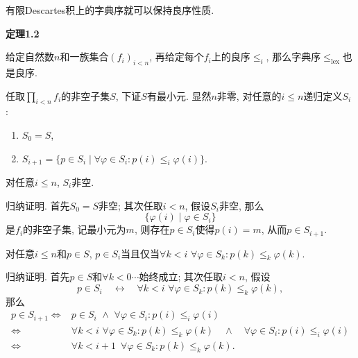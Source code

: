 \newpage

有限Descartes积上的字典序就可以保持良序性质.

\vspace{10pt}

\hypertarget{sec:定理1.2}{}
\noindent\textbf{定理1.2}

给定自然数$n$和一族集合$(f_i)_{i<n}$,
再给定每个$f_i$上的良序$\leqslant_i$, 那么字典序$\leqslant_{\mathrm{lex}}$也是良序.


任取$\displaystyle\prod_{i<n}f_i$的非空子集$S$, 下证$S$有最小元.
显然$n$非零, 对任意的$i\leqslant n$递归定义$S_i$ :
\vspace{6pt}
\begin{enumerate}
    \item $S_0=S$,
    \item $S_{i+1}=\{p\in S_i\mid\forall\varphi\in S_i:p(i)\leqslant_i\varphi(i)\}$.
\end{enumerate}

\vspace{5pt}\hspace{-1em}{\kaishu 命题1.} 对任意$i\leqslant n$, $S_i$非空.

\vspace{3pt}
归纳证明. 首先$S_0=S$非空; 其次任取$i<n$, 假设$S_i$非空, 那么
\[
    \{\varphi(i)\mid\varphi\in S_i\}
\]
是$f_i$的非空子集, 记最小元为$m$, 则存在$p\in S_i$使得$p(i)=m$, 从而$p\in S_{i+1}$.

\vspace{5pt}\hspace{-1em}{\kaishu 命题2.}
对任意$i\leqslant n$和$p\in S$,
$p\in S_i$当且仅当$\forall k<i\,\,\forall\varphi\in S_k:p(k)\leqslant_k\varphi(k)$.

\vspace{3pt}
归纳证明. 首先$p\in S$和$\forall k<0\cdots$始终成立; 其次任取$i<n$, 假设
\[
    p\in S_i\quad\leftrightarrow\quad
    \forall k<i\,\,\forall\varphi\in S_k:p(k)\leqslant_k\varphi(k),
\]
那么
\[\begin{aligned}
    p\in S_{i+1}
    \iff&p\in S_i\,\,\land\,\,\forall\varphi\in S_i:p(i)\leqslant_i\varphi(i)\\[-3pt]
    \iff&\forall k<i\,\,\forall\varphi\in S_k:p(k)\leqslant_k\varphi(k)
    \quad\land\quad\forall\varphi\in S_i:p(i)\leqslant_i\varphi(i)\\[-3pt]
    \iff&\forall k<i+1\,\,\,\forall\varphi\in S_k:p(k)\leqslant_k\varphi(k).
\end{aligned}\]

